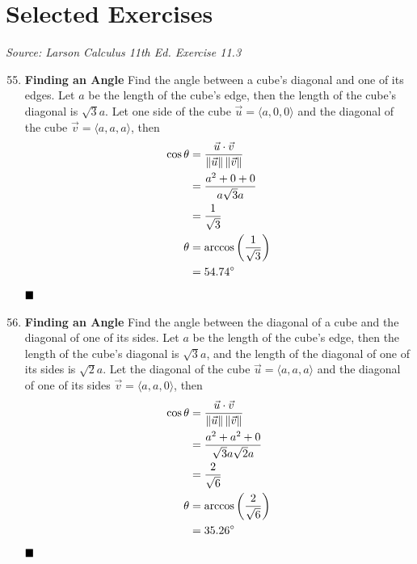 \newpage
\section*{Selected Exercises}
\textit{Source: Larson Calculus 11th Ed. Exercise 11.3}

\begin{enumerate}
    \setcounter{enumi}{54}
    \item \textbf{Finding an Angle} Find the angle between a cube's diagonal and one of its edges.
          \sol{} Let $a$ be the length of the cube's edge, then the length of the cube's diagonal is $\sqrt{3}a$. Let one side of the cube $\vec{u} = \langle a, 0, 0 \rangle$ and the diagonal of the cube $\vec{v} = \langle a, a, a \rangle$, then
          \begin{align*}
              \cos\theta & = \frac{\vec{u} \cdot \vec{v}}{\left\lVert\vec{u}\right\rVert \left\lVert\vec{v}\right\rVert} \\
                         & = \frac{a^2 + 0 + 0}{a\sqrt{3}a}                              \\
                         & = \frac{1}{\sqrt{3}}                                          \\
              \theta     & = \arccos\left(\frac{1}{\sqrt{3}}\right)                      \\
                         & = 54.74^{\circ}
          \end{align*}
          $\hfill\blacksquare$

    \item \textbf{Finding an Angle} Find the angle between the diagonal of a cube and the diagonal of one of its sides.
          \sol{} Let $a$ be the length of the cube's edge, then the length of the cube's diagonal is $\sqrt{3}a$, and the length of the diagonal of one of its sides is $\sqrt{2}a$. Let the diagonal of the cube $\vec{u} = \langle a, a, a \rangle$ and the diagonal of one of its sides $\vec{v} = \langle a, a, 0 \rangle$, then
          \begin{align*}
              \cos\theta & = \frac{\vec{u} \cdot \vec{v}}{\left\lVert\vec{u}\right\rVert \left\lVert\vec{v}\right\rVert} \\
                         & = \frac{a^2 + a^2 + 0}{\sqrt{3}a\sqrt{2}a}                    \\
                         & = \frac{2}{\sqrt{6}}                                          \\
              \theta     & = \arccos\left(\frac{2}{\sqrt{6}}\right)                      \\
                         & = 35.26^{\circ}
          \end{align*}
          $\hfill\blacksquare$


\end{enumerate}
